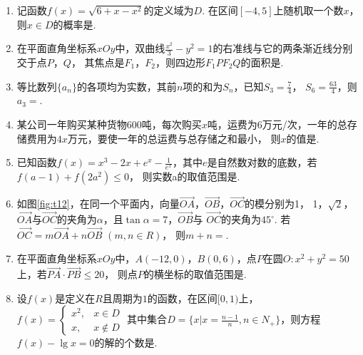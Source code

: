 \documentclass[12pt,space]{ctexart} %
\begin{document}
\begin{enumerate}[itemsep=-0.3em,topsep=0pt]
  \item 记函数$\displaystyle{f(x)=\sqrt{6+x-x^2}}$的定义域为$D$. 在区间$[-4,5]$上随机取一个数$x$，
        则$x\in D$的概率是.
  \item 在平面直角坐标系$xOy$中，双曲线$\displaystyle{\frac{x^2}{3}-y^2=1}$的右准线与它的两条渐近线分别交于点$P$，$Q$，
        其焦点是$F_1$，$F_2$，则四边形$F_1PF_2Q$的面积是.
  \item 等比数列$\{a_n\}$的各项均为实数，其前$n$项的和为$S_n$，已知$\displaystyle{S_3=\frac{7}{4}}$，
        $\displaystyle{S_6=\frac{63}{4}}$，则$a_3=$.
  \item 某公司一年购买某种货物$600$吨，每次购买$x$吨，运费为$6$万元/次，一年的总存储费用为$4x$万元，要使一年的总运费与总存储之和最小，
        则$x$的值是.
  \item 已知函数$\displaystyle{f(x)=x^3-2x+e^x-\frac{1}{e^x}}$，其中$e$是自然数对数的底数，若$f(a-1)+f(2a^2)\leq 0$，
        则实数a的取值范围是\blank{$[-1, \frac{1}{2}]$}.
  \item 如图\ref{fig:t12}，在同一个平面内，向量$\overrightarrow{OA}$，$\overrightarrow{OB}$，$\overrightarrow{OC}$的模分别为1，
        1，$\sqrt{2}$，$\overrightarrow{OA}$与$\overrightarrow{OC}$的夹角为$\alpha$，且$\tan\alpha=7$，$\overrightarrow{OB}$与
        $\overrightarrow{OC}$的夹角为$45^\circ$. 若$\overrightarrow{OC}=m\overrightarrow{OA}+n\overrightarrow{OB}$ $(m, n \in R)$，
        则$m+n=$.
  \item 在平面直角坐标系$xOy$中，$A(-12,0)$，$B(0,6)$，点$P$在圆$O: x^2+y^2=50$上，若$\overrightarrow{PA}\cdot\overrightarrow{PB}\leq 20$，
        则点$P$的横坐标的取值范围是\blank{$[-5\sqrt{2}, 1]$}.
  \item 设$f(x)$是定义在$R$且周期为$1$的函数，在区间$[0,1)$上，$\displaystyle{f(x)=\begin{cases}x^2,&x\in D\\x,&x\notin D\end{cases}}$
        其中集合$\displaystyle{D=\{x|x=\frac{n-1}{n}, n\in N_+\}}$，则方程$f(x)-\lg x=0$的解的个数是.
\end{enumerate}
\end{document}
